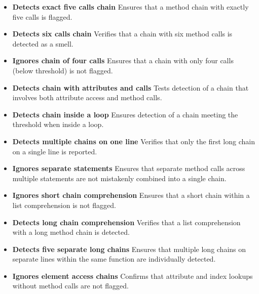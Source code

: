 \documentclass[12pt, titlepage]{article}
\begin{document}
  \begin{itemize}
    \item \textbf{Detects exact five calls chain} \newline
      Ensures that a method chain with exactly five calls is flagged.

    \item \textbf{Detects six calls chain} \newline
      Verifies that a chain with six method calls is detected as a smell.

    \item \textbf{Ignores chain of four calls} \newline
      Ensures that a chain with only four calls (below threshold) is
      not flagged.

    \item \textbf{Detects chain with attributes and calls} \newline
      Tests detection of a chain that involves both attribute access
      and method calls.

    \item \textbf{Detects chain inside a loop} \newline
      Ensures detection of a chain meeting the threshold when inside a loop.

    \item \textbf{Detects multiple chains on one line} \newline
      Verifies that only the first long chain on a single line is reported.

    \item \textbf{Ignores separate statements} \newline
      Ensures that separate method calls across multiple statements
      are not mistakenly combined into a single chain.

    \item \textbf{Ignores short chain comprehension} \newline
      Ensures that a short chain within a list comprehension is not flagged.

    \item \textbf{Detects long chain comprehension} \newline
      Verifies that a list comprehension with a long method chain is detected.

    \item \textbf{Detects five separate long chains} \newline
      Ensures that multiple long chains on separate lines within the
      same function are individually detected.

    \item \textbf{Ignores element access chains} \newline
      Confirms that attribute and index lookups without method calls
      are not flagged.
  \end{itemize}
\end{document}
